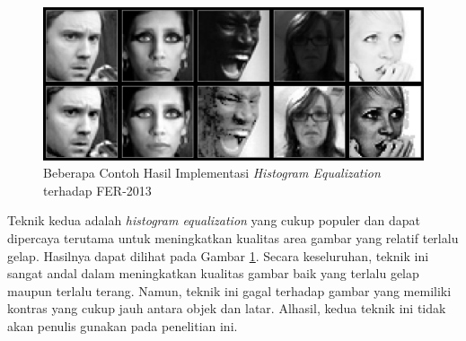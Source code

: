 \begin{figure}[t]
    \centering
    \includegraphics[width=14cm]{gambar/contoh_histogram_equalization.png}
    \caption{Beberapa Contoh Hasil Implementasi \textit{Histogram Equalization} terhadap FER-2013}
    \label{fig:contohhistogramequalization}
\end{figure}
Teknik kedua adalah \textit{histogram equalization} yang cukup populer dan dapat dipercaya terutama untuk meningkatkan kualitas area gambar yang relatif terlalu gelap. Hasilnya dapat dilihat pada Gambar \ref{fig:contohhistogramequalization}. Secara keseluruhan, teknik ini sangat andal dalam meningkatkan kualitas gambar baik yang terlalu gelap maupun terlalu terang. Namun, teknik ini gagal terhadap gambar yang memiliki kontras yang cukup jauh antara objek dan latar. Alhasil, kedua teknik ini tidak akan penulis gunakan pada penelitian ini.

